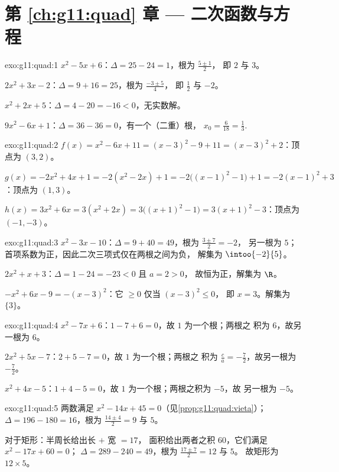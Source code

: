 \section*{第 \ref{ch:g11:quad} 章 --- 二次函数与方程}

\begin{solution}{exo:g11:quad:1}
$x^2-5x+6$：$\Delta = 25 - 24 = 1$，根为 $\frac{5 \pm 1}{2}$，
即 $2$ 与 $3$。

$2x^2+3x-2$：$\Delta = 9 + 16 = 25$，根为 $\frac{-3 \pm 5}{4}$，
即 $\frac12$ 与 $-2$。

$x^2+2x+5$：$\Delta = 4 - 20 = -16 < 0$，无实数解。

$9x^2-6x+1$：$\Delta = 36 - 36 = 0$，有一个（二重）根，
$x_0 = \frac{6}{18} = \frac13$.
\end{solution}

\begin{solution}{exo:g11:quad:2}
$f(x) = x^2 - 6x + 11 = (x-3)^2 - 9 + 11 = (x-3)^2 + 2$：顶点为 $(3, 2)$。

$g(x) = -2x^2+4x+1 = -2(x^2 - 2x) + 1 = -2\bigl((x-1)^2 - 1\bigr) + 1
= -2(x-1)^2 + 3$：顶点为 $(1, 3)$。

$h(x) = 3x^2 + 6x = 3(x^2 + 2x) = 3\bigl((x+1)^2 - 1\bigr)
= 3(x+1)^2 - 3$：顶点为 $(-1, -3)$。
\end{solution}

\begin{solution}{exo:g11:quad:3}
$x^2 - 3x - 10$：$\Delta = 9 + 40 = 49$，根为 $\frac{3 \pm 7}{2} = -2$，
另一根为 $5$；首项系数为正，因此二次三项式仅在两根之间为负，
解集为 $\intoo{-2}{5}$。

$2x^2 + x + 3$：$\Delta = 1 - 24 = -23 < 0$ 且 $a = 2 > 0$，
故恒为正，解集为 $\R$。

$-x^2 + 6x - 9 = -(x-3)^2$：它 $\geq 0$ 仅当 $(x-3)^2 \leq 0$，
即 $x = 3$。解集为 $\{3\}$。
\end{solution}

\begin{solution}{exo:g11:quad:4}
$x^2 - 7x + 6$：$1 - 7 + 6 = 0$，故 $1$ 为一个根；两根之
积为 $6$，故另一根为 $6$。

$2x^2 + 5x - 7$：$2 + 5 - 7 = 0$，故 $1$ 为一个根；两根之
积为 $\frac{c}{a} = -\frac72$，故另一根为 $-\frac72$。

$x^2 + 4x - 5$：$1 + 4 - 5 = 0$，故 $1$ 为一个根；两根之积为 $-5$，故
另一根为 $-5$。
\end{solution}

\begin{solution}{exo:g11:quad:5}
两数满足 $x^2 - 14x + 45 = 0$（见\cref{prop:g11:quad:vieta}）；
$\Delta = 196 - 180 = 16$，根为 $\frac{14 \pm 4}{2} = 9$ 与 $5$。

对于矩形：半周长给出长 $+$ 宽 $= 17$，
面积给出两者之积 $60$，它们满足 $x^2 - 17x + 60 = 0$；
$\Delta = 289 - 240 = 49$，根为 $\frac{17 \pm 7}{2} = 12$ 与 $5$。
故矩形为 $12 \times 5$。
\end{solution}

